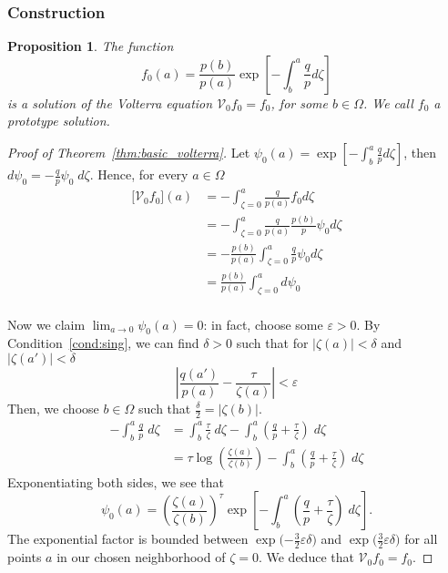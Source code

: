 \documentclass{article}
\theoremstyle{plain}
\newtheorem{prop}{Proposition}
\newcommand{\hardpart}{\mathcal{V}_0}
\begin{document}
\subsubsection{Construction}\label{sec:construction}
\color{Tomato}
\begin{prop}\label{prop:construction}
    The function 
    \begin{equation}%
    f_0(a)=\frac{p(b)}{p(a)} \exp\left[-\int_{b}^{a}\frac{q}{p} d\zeta\right]
   \end{equation}
is a solution of the Volterra equation $\hardpart f_0=f_0$, for some $b\in\Omega$. We call $f_0$ a prototype solution.  
\end{prop}
\color{black}
\begin{proof}[Proof of Theorem~\ref{thm:basic_volterra}]
    Let $\psi_0(a)= \exp\left[-\int_{b}^{a}\frac{q}{p} d\zeta\right]$, then $ d \psi_0 = -\frac{q}{p} \psi_0\;d\zeta $. Hence, for every $a\in\Omega$ 
    \begin{align*}
        \big[\hardpart f_0\big](a) &= - \int_{\zeta=0}^{a} \frac{q}{p(a)} f_0 d\zeta \\
        &= - \int_{\zeta=0}^{a} \frac{q}{p(a)} \frac{p(b)}{p}\psi_0 d\zeta \\
        &= - \frac{p(b)}{p(a)}  \int_{\zeta=0}^{a} \frac{q}{p} \psi_0 d\zeta\\
        &= \frac{p(b)}{p(a)}  \int_{\zeta=0}^{a} d\psi_0  \\
    \end{align*}

    Now we claim $\lim_{a\to 0}\psi_0(a)=0$: in fact, choose some $\varepsilon>0$. By Condition~\eqref{cond:sing}, we can find $\delta>0$ such that for $|\zeta(a)|<\delta$ and $|\zeta(a')|<\delta$
\begin{equation}\label{eqn:limit_h1}
\left|\frac{q(a')}{p(a)} - \frac{\tau}{\zeta(a)}\right|<\varepsilon
\end{equation}
 Then, we choose $b\in\Omega$ such that $\tfrac{\delta}{2}=|\zeta(b)|$.
\begin{align*}
-\int_b^a \frac{q}{p}\;d\zeta & = \int_b^a \frac{\tau}{\zeta}\;d\zeta - \int_b^a \left( \frac{q}{p} + \frac{\tau}{\zeta} \right)\;d\zeta \\
& = \tau \log\left(\frac{\zeta(a)}{\zeta(b)}\right) - \int_b^a \left( \frac{q}{p} + \frac{\tau}{\zeta} \right)\;d\zeta
\end{align*}
Exponentiating both sides, we see that
\[ \psi_0(a) = \left(\frac{\zeta(a)}{\zeta(b)}\right)^\tau \exp\left[-\int_b^a \left( \frac{q}{p} + \frac{\tau}{\zeta} \right)\;d\zeta\right]. \]
The exponential factor is bounded between $\exp\big({-\tfrac{3}{2}\varepsilon\delta}\big)$ and $\exp\big(\tfrac{3}{2}\varepsilon\delta\big)$ for all points $a$ in our chosen neighborhood of $\zeta = 0$. We deduce that $\hardpart  f_0=f_0$. 
\end{proof}
\end{document}
